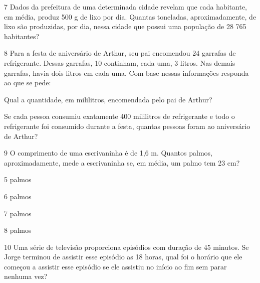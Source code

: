 \num{7} Dados da prefeitura de uma determinada cidade revelam que cada
habitante, em média, produz 500 g de lixo por dia. Quantas toneladas,
aproximadamente, de lixo são produzidas, por dia, nessa cidade que
possui uma população de 28 765 habitantes?



\num{8} Para a festa de aniversário de Arthur, seu pai encomendou 24
garrafas de refrigerante. Dessas garrafas, 10 continham, cada uma, 3
litros. Nas demais garrafas, havia dois litros em cada uma. Com base
nessas informações responda ao que se pede:

\begin{escolha}
\item
  Qual a quantidade, em mililitros, encomendada pelo pai de Arthur?


\item
  Se cada pessoa consumiu exatamente 400 mililitros de refrigerante e
  todo o refrigerante foi consumido durante a festa, quantas pessoas
  foram ao aniversário de Arthur?

\end{escolha}


\num{9} O comprimento de uma escrivaninha é de 1,6 m. Quantos palmos,
aproximadamente, mede a escrivaninha se, em média, um palmo tem 23 cm?

\begin{escolha}
\item
  5 palmos
\item
  6 palmos
\item
  7 palmos
\item
  8 palmos
\end{escolha}


\num{10} Uma série de televisão proporciona episódios com duração de 45
minutos. Se Jorge terminou de assistir esse episódio as 18 horas, qual
foi o horário que ele começou a assistir esse episódio se ele assistiu
no início ao fim sem parar nenhuma vez?

